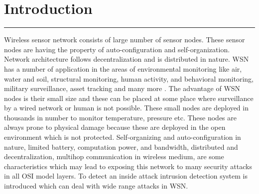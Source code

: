 \chapter{Introduction}
\label{C1} %
\graphicspath{{Figures/PDF/}{Figures/PNG/}}
\noindent\rule{\linewidth}{2pt}

\noindent Wireless sensor network consists of large number of sensor nodes. These sensor nodes are having the property of auto-configuration and self-organization. Network architecture follows decentralization and is distributed in nature. WSN has a number of application in the areas of environmental monitoring like air, water and soil, structural monitoring, human activity, and behavioral monitoring, military surveillance, asset tracking and many more \cite{akyildiz2002wireless}. The advantage of WSN nodes is their small size and these can be placed at some place where surveillance by a wired network or human is not possible. These small nodes are deployed in thousands in number to monitor temperature, pressure etc. These nodes are always prone to physical damage because these are deployed in the open environment which is not protected. Self-organizing and auto-configuration in nature, limited battery, computation power, and bandwidth, distributed and decentralization, multihop communication in wireless medium, are some characteristics which may lead to exposing this network to many security attacks in all OSI model layers. 
To detect an inside attack intrusion detection system is introduced which can deal with wide range attacks in WSN.
\par

